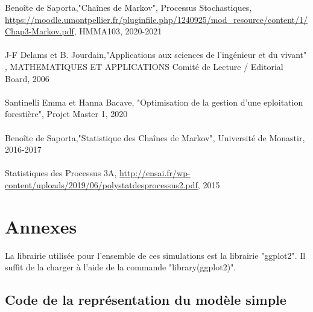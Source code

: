 \documentclass[12pt,a4paper]{report}
\theoremstyle{remark}
\begin{document}
\begin{thebibliography}{8} 
 Benoîte de Saporta,{"Chaînes de Markov",  Processus Stochastiques, \url{https://moodle.umontpellier.fr/pluginfile.php/1240925/mod_resource/content/1/Chap3-Markov.pdf}, HMMA103, 2020-2021}
\\
\\
 J-F Delams et B. Jourdain,{"Applications aux sciences de l'ingénieur et du vivant" , MATHEMATIQUES ET APPLICATIONS Comité de Lecture / Editorial Board, 2006 } 
\\
\\
 Santinelli Emma et Hanna Bacave, {"Optimisation de la gestion d'une eploitation forestière", Projet Master 1, 2020}
\\
\\
 Benoîte de Saporta,{"Statistique des Chaînes de Markov",  Université de Monastir, 2016-2017} 
\\
\\
 Statistiques des Processus 3A, {\url{http://ensai.fr/wp-content/uploads/2019/06/polystatdesprocessus2.pdf}, 2015}
\end{thebibliography}


\chapter*{Annexes}
La librairie utilisée pour l'ensemble de ces simulations est la librairie "ggplot2". Il suffit de la charger à l'aide de la commande "library(ggplot2)".

\section*{Code de la représentation du modèle simple}
\end{document}
